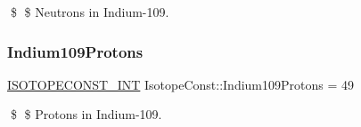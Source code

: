 \$ \$ Neutrons in Indium-\/109. \mbox{\label{group___isotope_const-_indium-_in109_ga9a7719759ce071be3f5c0f155c211092}} 
\subsubsection{\texorpdfstring{Indium109\+Protons}{Indium109Protons}}
{\footnotesize\ttfamily \mbox{\hyperlink{group___isotope_const-_macros_ga5f18360b3e99483a35c32d789e62621c}{I\+S\+O\+T\+O\+P\+E\+C\+O\+N\+S\+T\+\_\+\+I\+NT}} Isotope\+Const\+::\+Indium109\+Protons = 49}

\$ \$ Protons in Indium-\/109. 